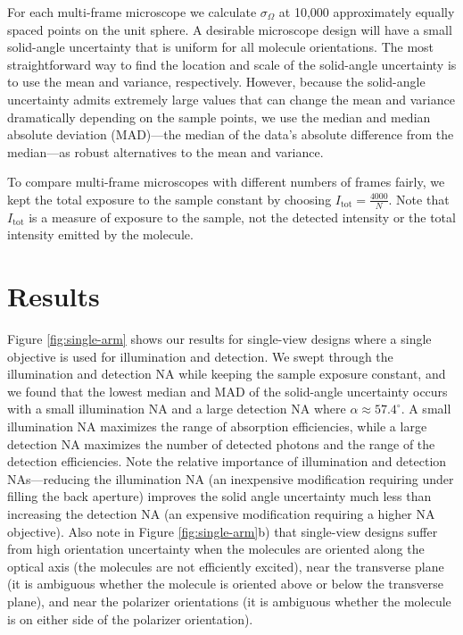 \documentclass[10pt]{article}
\begin{document}
For each multi-frame microscope we calculate $\sigma_{\Omega}$ at 10,000
approximately equally spaced points on the unit sphere. A desirable microscope
design will have a small solid-angle uncertainty that is uniform for all
molecule orientations. The most straightforward way to find the location and
scale of the solid-angle uncertainty is to use the mean and variance,
respectively. However, because the solid-angle uncertainty admits extremely
large values that can change the mean and variance dramatically depending on the
sample points, we use the median and median absolute deviation (MAD)---the
median of the data's absolute difference from the median---as robust
alternatives to the mean and variance.

To compare multi-frame microscopes with different numbers of frames fairly, we
kept the total exposure to the sample constant by choosing
$I_{\text{tot}} = \frac{4000}{N}$. Note that $I_{\text{tot}}$ is a measure of
exposure to the sample, not the detected intensity or the total intensity
emitted by the molecule.

\section{Results}\label{results}
Figure \ref{fig:single-arm} shows our results for single-view designs where a
single objective is used for illumination and detection. We swept through the
illumination and detection NA while keeping the sample exposure constant, and we
found that the lowest median and MAD of the solid-angle uncertainty occurs with
a small illumination NA and a large detection NA where
$\alpha \approx 57.4^{\circ}$. A small illumination NA maximizes the range of
absorption efficiencies, while a large detection NA maximizes the number of
detected photons and the range of the detection efficiencies. Note the relative
importance of illumination and detection NAs---reducing the illumination NA (an
inexpensive modification requiring under filling the back aperture) improves the
solid angle uncertainty much less than increasing the detection NA (an expensive
modification requiring a higher NA objective). Also note in Figure
\ref{fig:single-arm}b) that single-view designs suffer from high orientation
uncertainty when the molecules are oriented along the optical axis (the
molecules are not efficiently excited), near the transverse plane (it is
ambiguous whether the molecule is oriented above or below the transverse plane),
and near the polarizer orientations (it is ambiguous whether the molecule is on
either side of the polarizer orientation).
\end{document}
